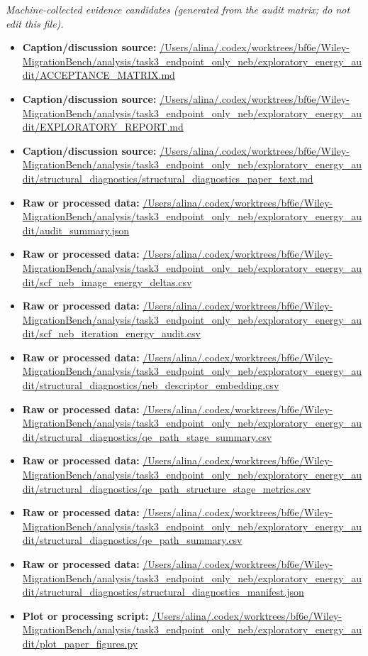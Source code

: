 \emph{Machine-collected evidence candidates (generated from the audit matrix; do not edit this file).}
\begin{itemize}[leftmargin=1.4em,noitemsep]
\item \textbf{Caption/discussion source:} \url{/Users/alina/.codex/worktrees/bf6e/Wiley-MigrationBench/analysis/task3_endpoint_only_neb/exploratory_energy_audit/ACCEPTANCE_MATRIX.md}
\item \textbf{Caption/discussion source:} \url{/Users/alina/.codex/worktrees/bf6e/Wiley-MigrationBench/analysis/task3_endpoint_only_neb/exploratory_energy_audit/EXPLORATORY_REPORT.md}
\item \textbf{Caption/discussion source:} \url{/Users/alina/.codex/worktrees/bf6e/Wiley-MigrationBench/analysis/task3_endpoint_only_neb/exploratory_energy_audit/structural_diagnostics/structural_diagnostics_paper_text.md}
\item \textbf{Raw or processed data:} \url{/Users/alina/.codex/worktrees/bf6e/Wiley-MigrationBench/analysis/task3_endpoint_only_neb/exploratory_energy_audit/audit_summary.json}
\item \textbf{Raw or processed data:} \url{/Users/alina/.codex/worktrees/bf6e/Wiley-MigrationBench/analysis/task3_endpoint_only_neb/exploratory_energy_audit/scf_neb_image_energy_deltas.csv}
\item \textbf{Raw or processed data:} \url{/Users/alina/.codex/worktrees/bf6e/Wiley-MigrationBench/analysis/task3_endpoint_only_neb/exploratory_energy_audit/scf_neb_iteration_energy_audit.csv}
\item \textbf{Raw or processed data:} \url{/Users/alina/.codex/worktrees/bf6e/Wiley-MigrationBench/analysis/task3_endpoint_only_neb/exploratory_energy_audit/structural_diagnostics/neb_descriptor_embedding.csv}
\item \textbf{Raw or processed data:} \url{/Users/alina/.codex/worktrees/bf6e/Wiley-MigrationBench/analysis/task3_endpoint_only_neb/exploratory_energy_audit/structural_diagnostics/qe_path_stage_summary.csv}
\item \textbf{Raw or processed data:} \url{/Users/alina/.codex/worktrees/bf6e/Wiley-MigrationBench/analysis/task3_endpoint_only_neb/exploratory_energy_audit/structural_diagnostics/qe_path_structure_stage_metrics.csv}
\item \textbf{Raw or processed data:} \url{/Users/alina/.codex/worktrees/bf6e/Wiley-MigrationBench/analysis/task3_endpoint_only_neb/exploratory_energy_audit/structural_diagnostics/qe_path_summary.csv}
\item \textbf{Raw or processed data:} \url{/Users/alina/.codex/worktrees/bf6e/Wiley-MigrationBench/analysis/task3_endpoint_only_neb/exploratory_energy_audit/structural_diagnostics/structural_diagnostics_manifest.json}
\item \textbf{Plot or processing script:} \url{/Users/alina/.codex/worktrees/bf6e/Wiley-MigrationBench/analysis/task3_endpoint_only_neb/exploratory_energy_audit/plot_paper_figures.py}
\end{itemize}
